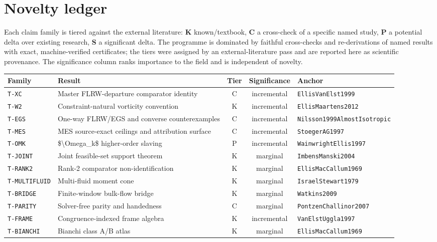 \documentclass[11pt]{article}
\newcommand{\code}[1]{\texttt{#1}}
\begin{document}
\section{Novelty ledger}
\label{sec:tiers}
Each claim family is tiered against the external literature: \textbf{K}
known/textbook, \textbf{C} a cross-check of a specific named study, \textbf{P} a
potential delta over existing research, \textbf{S} a significant delta. The
programme is dominated by faithful cross-checks and re-derivations of named
results with exact, machine-verified certificates; the tiers were assigned by an
external-literature pass and are reported here as scientific provenance. The
significance column ranks importance to the field and is independent of novelty.

\begin{center}
\begin{longtable}{llccl}
\toprule
Family & Result & Tier & Significance & Anchor \\
\midrule
\code{T-XC} & Master FLRW-departure comparator identity & C & incremental & \code{EllisVanElst1999} \\
\code{T-W2} & Constraint-natural vorticity convention & K & incremental & \code{EllisMaartens2012} \\
\code{T-EGS} & One-way FLRW/EGS and converse counterexamples & C & incremental & \code{Nilsson1999AlmostIsotropic} \\
\code{T-MES} & MES source-exact ceilings and attribution surface & C & incremental & \code{StoegerAG1997} \\
\code{T-OMK} & \$\textbackslash{}Omega\_k\$ higher-order slaving & P & incremental & \code{WainwrightEllis1997} \\
\code{T-JOINT} & Joint feasible-set support theorem & K & marginal & \code{ImbensManski2004} \\
\code{T-RANK2} & Rank-2 comparator non-identification & K & marginal & \code{EllisMacCallum1969} \\
\code{T-MULTIFLUID} & Multi-fluid moment cone & K & marginal & \code{IsraelStewart1979} \\
\code{T-BRIDGE} & Finite-window bulk-flow bridge & K & marginal & \code{Watkins2009} \\
\code{T-PARITY} & Solver-free parity and handedness & C & marginal & \code{PontzenChallinor2007} \\
\code{T-FRAME} & Congruence-indexed frame algebra & K & incremental & \code{VanElstUggla1997} \\
\code{T-BIANCHI} & Bianchi class A/B atlas & K & marginal & \code{EllisMacCallum1969} \\

\end{longtable}
\end{center}
\end{document}

